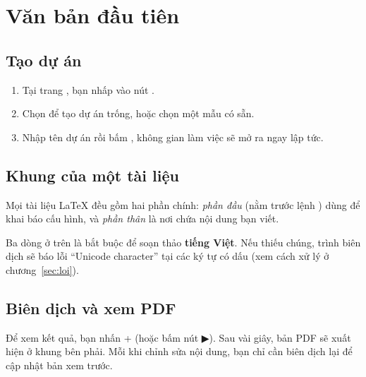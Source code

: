 \section{Văn bản đầu tiên}
\label{sec:van-ban}

\subsection{Tạo dự án}
\begin{enumerate}
  \item Tại trang , bạn nhấp vào nút .
  \item Chọn  để tạo dự án trống, hoặc chọn một mẫu có sẵn.
  \item Nhập tên dự án rồi bấm , không gian làm việc sẽ mở ra ngay
    lập tức.
\end{enumerate}

\subsection{Khung của một tài liệu}
Mọi tài liệu \LaTeX{} đều gồm hai phần chính: \emph{phần đầu} (nằm trước lệnh
) dùng để khai báo cấu hình, và \emph{phần thân} là nơi
chứa nội dung bạn viết.


\begin{chuy}
Ba dòng  ở trên là bắt buộc để soạn thảo \textbf{tiếng Việt}.
Nếu thiếu chúng, trình biên dịch sẽ báo lỗi ``Unicode character'' tại các ký tự
có dấu (xem cách xử lý ở chương~\ref{sec:loi}).
\end{chuy}

\subsection{Biên dịch và xem PDF}
Để xem kết quả, bạn nhấn + (hoặc bấm nút ▶). Sau vài giây,
bản PDF sẽ xuất hiện ở khung bên phải. Mỗi khi chỉnh sửa nội dung, bạn chỉ cần
biên dịch lại để cập nhật bản xem trước.

